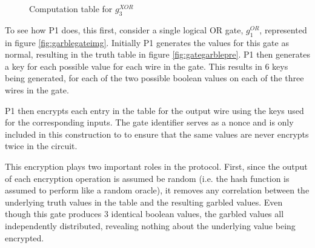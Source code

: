 \begin{figure}[t!]
    \caption{Computation table for $g^{XOR}_3$}
    \label{fig:xorgate}
\end{figure}

To see how \ac{P1} does, this first, consider a single logical OR gate, $g^{OR}_1$, represented in figure \ref{fig:garblegateimg}. Initially \ac{P1} generates the values for this gate as normal, resulting in the truth table in figure \ref{fig:gategarblepre}. \ac{P1} then generates a key for each possible value for each wire in the gate.  This results in 6 keys being generated, for each of the two possible boolean values on each of the three wires in the gate.

\ac{P1} then encrypts each entry in the table for the output wire using the keys used for the corresponding inputs.  The gate identifier serves as a nonce and is only included in this construction to to ensure that the same values are never encrypts twice in the circuit.

This encryption plays two important roles in the protocol.  First, since the output of each encryption operation is assumed be random (i.e. the hash function is assumed to perform like a random oracle), it removes any correlation between the underlying truth values in the table and the resulting garbled values. Even though this gate produces 3 identical boolean values, the garbled values all independently distributed, revealing nothing about the underlying value being encrypted.

